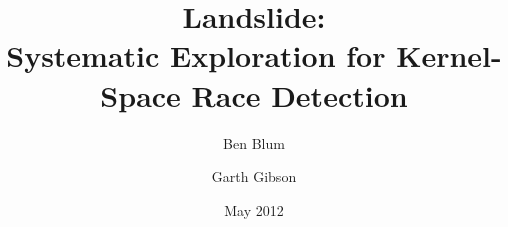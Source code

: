 \documentclass{llncs}
\begin{document}

\title{\bf Landslide: \\ Systematic Exploration for Kernel-Space Race Detection}
\author{Ben Blum \and Garth Gibson}
\date{May 2012}

\maketitle

\newcommand\true{\;\textit{true}}
\newcommand\false{\;\textit{false}}

\newcommand\alpher\alpha
\newcommand\beter\beta
\newcommand\gammer\gamma
\newcommand\delter\delta
\newcommand\zeter\zeta
\newcommand\Sigmer\Sigma

\newcommand\NN{\mathbb{N}}
\newcommand\QQ{\mathbb{Q}}
\newcommand\RR{\mathbb{R}}
\newcommand\ZZ{\mathbb{Z}}

\setcounter{changebargrey}{35}
\newcommand\revision[1]{#1}
\end{document}
